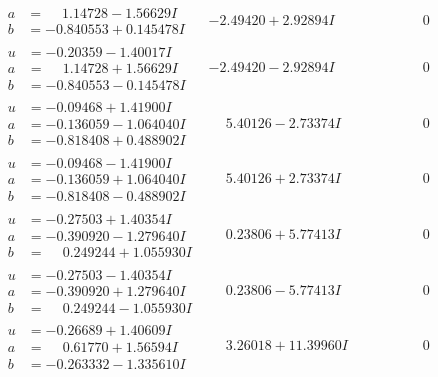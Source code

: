\documentclass[1p]{elsarticle_modified}
\theoremstyle{definition}
\begin{document}
$$\begin{array}{c|c|c}
\begin{aligned}
a &= \phantom{-}1.14728 - 1.56629 I \\
b &= -0.840553 + 0.145478 I\end{aligned}
 & -2.49420 + 2.92894 I & \phantom{-0.000000 } 0 \\ \hline\begin{aligned}
u &= -0.20359 - 1.40017 I \\
a &= \phantom{-}1.14728 + 1.56629 I \\
b &= -0.840553 - 0.145478 I\end{aligned}
 & -2.49420 - 2.92894 I & \phantom{-0.000000 } 0 \\ \hline\begin{aligned}
u &= -0.09468 + 1.41900 I \\
a &= -0.136059 - 1.064040 I \\
b &= -0.818408 + 0.488902 I\end{aligned}
 & \phantom{-}5.40126 - 2.73374 I & \phantom{-0.000000 } 0 \\ \hline\begin{aligned}
u &= -0.09468 - 1.41900 I \\
a &= -0.136059 + 1.064040 I \\
b &= -0.818408 - 0.488902 I\end{aligned}
 & \phantom{-}5.40126 + 2.73374 I & \phantom{-0.000000 } 0 \\ \hline\begin{aligned}
u &= -0.27503 + 1.40354 I \\
a &= -0.390920 - 1.279640 I \\
b &= \phantom{-}0.249244 + 1.055930 I\end{aligned}
 & \phantom{-}0.23806 + 5.77413 I & \phantom{-0.000000 } 0 \\ \hline\begin{aligned}
u &= -0.27503 - 1.40354 I \\
a &= -0.390920 + 1.279640 I \\
b &= \phantom{-}0.249244 - 1.055930 I\end{aligned}
 & \phantom{-}0.23806 - 5.77413 I & \phantom{-0.000000 } 0 \\ \hline\begin{aligned}
u &= -0.26689 + 1.40609 I \\
a &= \phantom{-}0.61770 + 1.56594 I \\
b &= -0.263332 - 1.335610 I\end{aligned}
 & \phantom{-}3.26018 + 11.39960 I & \phantom{-0.000000 } 0 \\ \hline\begin{aligned}

\end{aligned}
\end{array}$$
\end{document}
